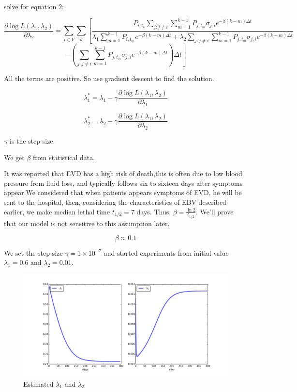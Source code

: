 \documentclass[11pt]{article}
\begin{document}
solve for equation 2:

$$
\frac{\partial \log L(\lambda_1, \lambda_2)}{\partial \lambda_2} = \sum_{i \in V} \sum_{k}\left[ { \frac{P_{i,t_k}\sum_{j:j\neq i} \sum_{m = 1}^{ k-1} P_{j,t_m} \sigma_{j,i} e^{-\beta(k-m)\Delta t} }{ \lambda_1 \sum_{m = 1}^{ k-1} P_{i,t_m} e^{-\beta(k-m)\Delta t} + \lambda_2 \sum_{j:j\neq i} \sum_{m = 1}^{ k-1} P_{j,t_m} \sigma_{j,i} e^{-\beta(k-m)\Delta t}}} \right.
$$
$$
\left. {- \left( \sum_{j:j\neq i} \sum_{m = 1}^{ k-1} P_{j,t_m} \sigma_{j,i} e^{-\beta(k-m)\Delta t} \right)\Delta t} \right] 
$$

All the terms are positive. So use gradient descent to find the solution.

$$\lambda_1^* = \lambda_1 - \gamma \frac{\partial \log L(\lambda_1, \lambda_2)}{\partial \lambda_1}$$

$$\lambda_2^* = \lambda_2 - \gamma \frac{\partial \log L(\lambda_1, \lambda_2)}{\partial \lambda_2}$$

$\gamma$ is the step size.

We get $\beta$ from statistical data. 


It was reported that EVD  has a high risk of death,this is often due to low blood pressure from fluid loss, and typically follows six to sixteen days after symptoms appear.We considered that when patients appears symptoms of EVD, he will be sent to the hospital, then, considering the characteristics of EBV described earlier, we make median lethal time $t_{1/2} =7 $ days. Thus, $\beta=\frac{\ln 2}{t_{1/2}}$. We'll prove that our model is not sensitive to this assumption later.

$$\beta \approx 0.1 $$

We set the step size $\gamma = 1\times 10^{-7}$ and started experiments from initial value $\lambda_1 = 0.6$ and $\lambda_2 = 0.01$.

\begin{figure}[hbtp]
\begin{center}
  \includegraphics[width=6in]{graph/iter.pdf}
  \caption{Estimated $\lambda_1$ and $\lambda_2$}
  \label{est2}
\end{center}  
\end{figure}
\end{document}
